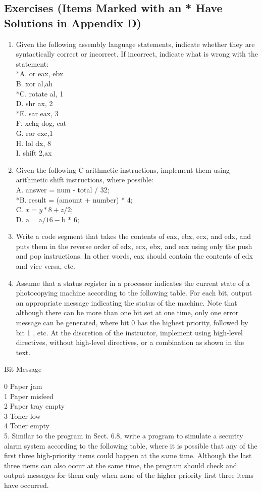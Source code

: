 \documentclass[10pt]{article}
\begin{document}
\subsection*{Exercises (Items Marked with an * Have Solutions in Appendix D)}
\begin{enumerate}
  \item Given the following assembly language statements, indicate whether they are syntactically correct or incorrect. If incorrect, indicate what is wrong with the statement:\\
*A. or eax, ebx\\
B. xor al,ah\\
*C. rotate al, 1\\
D. shr ax, 2\\
*E. sar eax, 3\\
F. xchg dog, cat\\
G. ror exc,1\\
H. lol dx, 8\\
I. shift 2,ax
  \item Given the following C arithmetic instructions, implement them using arithmetic shift instructions, where possible:\\
A. answer = num - total / 32;\\
*B. result = (amount + number) * 4;\\
C. $x=y * 8+z / 2$;\\
D. $\mathrm{a}=\mathrm{a} / 16-\mathrm{b}$ * 6;
  \item Write a code segment that takes the contents of eax, ebx, ecx, and edx, and puts them in the reverse order of edx, ecx, ebx, and eax using only the push and pop instructions. In other words, eax should contain the contents of edx and vice versa, etc.
  \item Assume that a status register in a processor indicates the current state of a photocopying machine according to the following table. For each bit, output an appropriate message indicating the status of the machine. Note that although there can be more than one bit set at one time, only one error message can be generated, where bit 0 has the highest priority, followed by bit 1 , etc. At the discretion of the instructor, implement using high-level directives, without high-level directives, or a combination as shown in the text.
\end{enumerate}

Bit Message

0 Paper jam\\
1 Paper misfeed\\
2 Paper tray empty\\
3 Toner low\\
4 Toner empty\\
5. Similar to the program in Sect. 6.8, write a program to simulate a security alarm system according to the following table, where it is possible that any of the first three high-priority items could happen at the same time. Although the last three items can also occur at the same time, the program should check and output messages for them only when none of the higher priority first three items have occurred.
\end{document}

